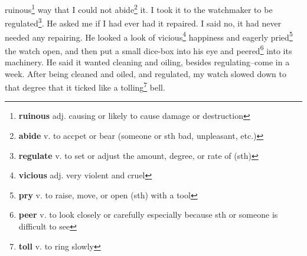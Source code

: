ruinous\footnote{\textbf{ruinous} adj. causing or likely to cause damage or destruction} way that I could not abide\footnote{\textbf{abide} v. to accpet or bear (someone or sth bad, unpleasant, etc.)} it. I took it to the watchmaker to be regulated\footnote{\textbf{regulate} v. to set or adjust the amount, degree, or rate of (sth)}. He asked me if I had ever had it repaired. I said no, it had never needed any repairing. He looked a look of vicious\footnote{\textbf{vicious} adj. very violent and cruel} happiness and eagerly pried\footnote{\textbf{pry} v. to raise, move, or open (sth) with a tool} the watch open, and then put a small dice-box into his eye and peered\footnote{\textbf{peer} v. to look closely or carefully especially because sth or someone is difficult to see} into its machinery. He said it wanted cleaning and oiling, besides regulating--come in a week. After being cleaned and oiled, and regulated, my watch slowed down to that degree that it ticked like a tolling\footnote{\textbf{toll} v. to ring slowly} bell.
